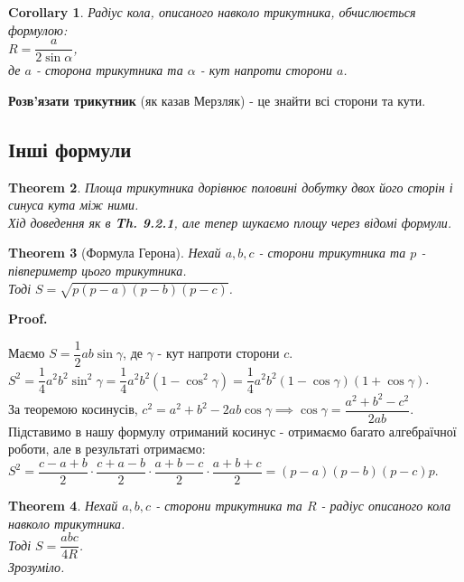 \documentclass[a4paper, 10pt]{article}
\makeatletter
\def\qed{$\blacksquare$}
\theoremstyle{theoremdd}
\newtheorem{theorem}{Theorem}[subsection]
\theoremstyle{theoremdd}
\theoremstyle{theoremdd}
\theoremstyle{theoremdd}
\theoremstyle{theoremdd}
\theoremstyle{theoremdd}
\theoremstyle{theoremdd}
\theoremstyle{theoremdd}
\theoremstyle{theoremdd}
\newtheorem{corollary}[theorem]{Corollary}
\renewenvironment{proof}[1][Proof.\\]{\par
\pushQED{\hfill \qed}%
\normalfont \topsep6\p@\@plus6\p@\relax
\trivlist
\item\relax
{\bfseries
#1\@addpunct{.}}\hspace\labelsep\ignorespaces
}{%
\popQED\endtrivlist\@endpefalse
}
\makeatother
\begin{document}
\begin{corollary}
Радіус кола, описаного навколо трикутника, обчислюється формулою:\\
$R = \dfrac{a}{2 \sin \alpha}$, \\ де $a$ - сторона трикутника та $\alpha$ - кут напроти сторони $a$.
\end{corollary}

\textbf{Розв'язати трикутник} (як казав Мерзляк) - це знайти всі сторони та кути.

\subsection{Інші формули}
\begin{theorem}
Площа трикутника дорівнює половині добутку двох його сторін і синуса кута між ними.\\
\textit{Хід доведення як в \textbf{Th. 9.2.1}, але тепер шукаємо площу через відомі формули.}
\end{theorem}

\begin{theorem}[Формула Герона]
Нехай $a,b,c$ - сторони трикутника та $p$ - півпериметр цього трикутника. \\
Тоді $S = \sqrt{p(p-a)(p-b)(p-c)}$.
\end{theorem}

\begin{proof}
Маємо $S = \dfrac{1}{2}ab \sin \gamma$, де $\gamma$ - кут напроти сторони $c$.\\
$S^2 = \dfrac{1}{4}a^2 b^2 \sin^2 \gamma = \dfrac{1}{4} a^2 b^2 (1- \cos^2 \gamma) = \dfrac{1}{4}a^2 b^2 (1-\cos \gamma) (1+ \cos \gamma)$.\\
За теоремою косинусів, $c^2 = a^2+b^2-2ab \cos \gamma \implies \cos \gamma = \dfrac{a^2+b^2-c^2}{2ab}$.\\
Підставимо в нашу формулу отриманий косинус - отримаємо багато алгебраїчної роботи, але в результаті отримаємо:\\
$S^2 = \dfrac{c-a+b}{2} \cdot \dfrac{c+a-b}{2} \cdot \dfrac{a+b-c}{2} \cdot \dfrac{a+b+c}{2} = (p-a)(p-b)(p-c)p$.
\end{proof}

\begin{theorem}
Нехай $a,b,c$ - сторони трикутника та $R$ - радіус описаного кола навколо трикутника.\\
Тоді $S = \dfrac{abc}{4R}$.\\
\textit{Зрозуміло.}
\end{theorem}
\end{document}
